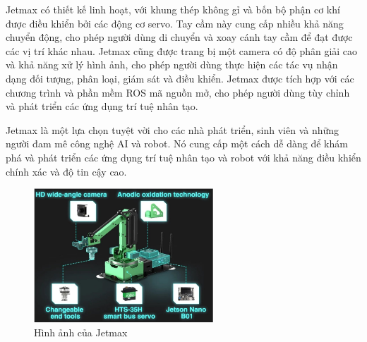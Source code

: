 Jetmax có thiết kế linh hoạt, với khung thép không gỉ và bốn bộ phận cơ khí được điều khiển bởi các động cơ servo. Tay cầm này cung cấp nhiều khả năng chuyển động, cho phép người dùng di chuyển và xoay cánh tay cầm để đạt được các vị trí khác nhau. Jetmax cũng được trang bị một camera có độ phân giải cao và khả năng xử lý hình ảnh, cho phép người dùng thực hiện các tác vụ nhận dạng đối tượng, phân loại, giám sát và điều khiển. Jetmax được tích hợp với các chương trình và phần mềm ROS mã nguồn mở, cho phép người dùng tùy chỉnh và phát triển các ứng dụng trí tuệ nhân tạo.

Jetmax là một lựa chọn tuyệt vời cho các nhà phát triển, sinh viên và những người đam mê công nghệ AI và robot. Nó cung cấp một cách dễ dàng để khám phá và phát triển các ứng dụng trí tuệ nhân tạo và robot với khả năng điều khiển chính xác và độ tin cậy cao.

\begin{figure}[!h]
    \centering
    \includegraphics[width=0.6\textwidth]{Images/Implementation/Control/Jetmax.jpg}
    \caption{Hình ảnh của Jetmax}
\end{figure}

